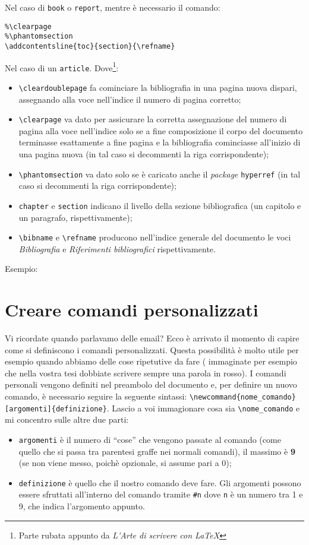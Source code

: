 Nel caso di \verb!book! o \verb!report!, mentre è necessario il comando:
\begin{lstlisting}
%\clearpage
%\phantomsection
\addcontentsline{toc}{section}{\refname}
\end{lstlisting}
Nel caso di un \verb!article!. Dove\footnote{Parte rubata appunto da 
\textit{L'Arte di scrivere con \LaTeX{}}}:
\begin{itemize}
    \item \verb!\cleardoublepage! fa cominciare la bibliografia in una pagina 
    nuova dispari, assegnando alla voce nell’indice il numero di pagina 
    corretto;
    \item \verb!\clearpage! va dato per assicurare la corretta assegnazione 
    del numero di pagina alla voce nell’indice solo se a fine composizione il 
    corpo del documento terminasse esattamente a fine pagina e la bibliografia 
    cominciasse all’inizio di una pagina nuova (in tal caso si decommenti la 
    riga corrispondente);
    \item \verb!\phantomsection! va dato solo se è caricato anche il \textit{
    package} \verb!hyperref! (in tal caso si decommenti la riga 
    corrispondente);
    \item \verb!chapter! e \verb!section! indicano il livello della sezione 
    bibliografica (un capitolo e un paragrafo, rispettivamente);
    \item \verb!\bibname! e \verb!\refname! producono nell’indice generale del 
    documento le voci \emph{Bibliografia} e \emph{Riferimenti bibliografici}
    rispettivamente.
\end{itemize}
Esempio:



\section{Creare comandi personalizzati}
Vi ricordate quando parlavamo delle email? Ecco è arrivato il momento di 
capire come si definiscono i comandi personalizzati. Questa possibilità è 
molto utile per esempio quando abbiamo delle cose ripetutive da fare (
immaginate per esempio che nella vostra tesi dobbiate scrivere sempre una 
parola in rosso). I comandi personali vengono definiti nel preambolo del 
documento e, per definire un nuovo comando, è necessario seguire la seguente 
sintassi: \verb!\newcommand{nome_comando}[argomenti]{definizione}!. Lascio a 
voi immagionare cosa sia \verb!\nome_comando! e mi concentro sulle altre due 
parti:
\begin{itemize}
    \item \verb!argomenti! è il numero di ``cose'' che vengono passate al 
    comando (come quello che si passa tra parentesi graffe nei normali 
    comandi), il massimo è \textbf{9} (se non viene messo, poichè opzionale, 
    si assume pari a 0);
    \item \verb!definizione! è quello che il nostro comando deve fare. Gli 
    argomenti possono essere sfruttati all'interno del comando tramite 
    \verb!#n! dove \verb!n! è un numero tra 1 e 9, che indica l'argomento 
    appunto.
\end{itemize}

